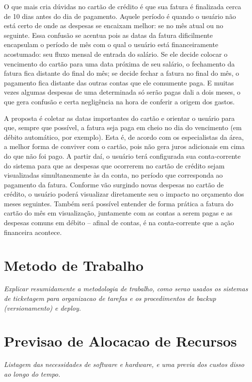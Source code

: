 \documentclass[a4paper,article]{abnt}
\begin{document}
O que mais cria dúvidas no cartão de crédito é que sua fatura é finalizada cerca de 10 dias antes do dia de pagamento. Aquele período é quando o usuário não está certo de onde as despesas se encaixam melhor: se no mês atual ou no seguinte. Essa confusão se acentua pois as datas da fatura dificilmente encapsulam o período de mês com o qual o usuário está financeiramente acostumado: seu fluxo mensal de entrada do salário. Se ele decide colocar o vencimento do cartão para uma data próxima de seu salário, o fechamento da fatura fica distante do final do mês; se decide fechar a fatura no final do mês, o pagamento fica distante das outras contas que ele comumente paga. E muitas vezes algumas despesas de uma determinada só serão pagas dali a dois meses, o que gera confusão e certa negligência na hora de conferir a origem dos gastos.

A proposta é coletar as datas importantes do cartão e orientar o usuário para que, sempre que possível, a fatura seja paga em cheio no dia do vencimento (em débito automático, por exemplo). Esta é, de acordo com os especialistas da área, a melhor forma de conviver com o cartão, pois não gera juros adicionais em cima do que não foi pago. A partir daí, o usuário terá configurada sua conta-corrente do sistema para que as despesas que ocorrerem no cartão de crédito sejam visualizadas simultaneamente às da conta, no período que corresponda ao pagamento da fatura. Conforme vão surgindo novas despesas no cartão de crédito, o usuário poderá visualizar diretamente seu o impacto no orçamento dos meses seguintes. Também será possível entender de forma prática a fatura do cartão do mês em visualização, juntamente com as contas a serem pagas e as despesas comuns em débito -- afinal de contas, é na conta-corrente que a ação financeira acontece.

\section{Metodo de Trabalho}
\emph{Explicar resumidamente a metodologia de trabalho, como serao usados os sistemas de ticketagem para organizacao de tarefas e os procedimentos de backup (versionamento) e deploy.}

\section{Previsao de Alocacao de Recursos}
\emph{Listagem das necessidades de software e hardware, e uma previa dos custos disso ao longo do tempo.}
\end{document}
